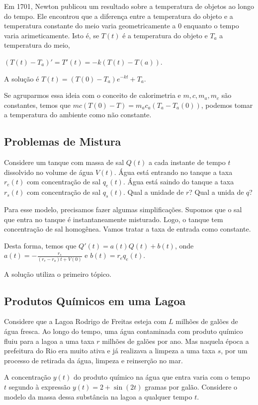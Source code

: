 \documentclass[12pt]{article}
\begin{document}
Em 1701, Newton publicou um resultado sobre a temperatura de objetos ao longo
do tempo. Ele encontrou que a diferença entre a temperatura do objeto e a
temperatura constante do meio varia geometricamente a 0 enquanto o tempo varia
arimeticamente. Isto é, se $T(t)$ é a temperatura do objeto e $T_a$ a
temperatura do meio, 

$(T(t) - T_a)' = T'(t) = -k(T(t) - T(a))$. 

A solução é $T(t) = (T(0) - T_a)e^{-kt} + T_a$. 

Se agruparmos essa ideia com o conceito de calorimetria e $m,c,m_a, m_c$
são constantes, temos que $mc(T(0) - T) = m_ac_a(T_a - T_a(0))$, podemos tomar
a temperatura do ambiente como não constante. 

\subsection{Problemas de Mistura}

Considere um tanque com massa de sal $Q(t)$ a cada instante de tempo $t$
dissolvido no volume de água $V(t)$. Água está entrando no tanque a taxa
$r_e(t)$ com concentração de sal $q_e(t)$. Água está saindo do tanque a taxa
$r_s(t)$ com concentração de sal $q_s(t)$. Qual a unidade de $r$? Qual a unida
de $q$? 

Para esse modelo, precisamos fazer algumas simplificações. Supomos que o sal
que entra no tanque é instantaneamente misturado. Logo, o tanque tem
concentração de sal homogênea. Vamos tratar a taxa de entrada como constante. 

Desta forma, temos que $Q'(t) = a(t)Q(t) + b(t)$, onde $a(t) =
-\frac{r_s}{(r_e - r_o)t + V(0)}$ e $b(t) = r_eq_e(t)$.

A solução utiliza o primeiro tópico. 

\subsection{Produtos Químicos em uma Lagoa}

Considere que a Lagoa Rodrigo de Freitas esteja com $L$ milhões de galões de
água fresca. Ao longo do tempo, uma água contaminada com produto químico fluiu
para a lagoa a uma taxa $r$ milhões de galões por ano. Mas naquela época a
prefeitura do Rio era muito ativa e já realizava a limpeza a uma taxa $s$, por
um processo de retirada da água, limpeza e reinserção no mar. 

A concentração $y(t)$ do produto químico na água que entra varia com o tempo $t$ segundo
à expressão $y(t) = 2 + \sin (2t)$ gramas por galão. Considere o modelo da
massa dessa substância na lagoa a qualquer tempo $t$. 
\end{document}
